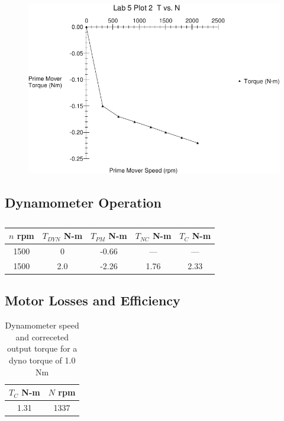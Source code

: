 \documentclass{article}
\begin{document}
\begin{figure}[H]
  \centering
  \includegraphics[width=\textwidth]{img/plot2}
  \caption{}
  \label{fig:plot_02}
\end{figure}

\subsection{Dynamometer Operation}

\begin{table}[H]
  \centering
  \begin{tabular}{*{5}{c}}
    $n$ rpm & $T_{DYN}$ N-m& $T_{PM}$ N-m & $T_{NC}$ N-m & $T_C$ N-m \\
    \hline
    1500 &   0 & -0.66 &  --- &  --- \\
    1500 & 2.0 & -2.26 & 1.76 & 2.33 \\
  \end{tabular}
  \caption{}
  \label{tab:table_03}
\end{table}

\subsection{Motor Losses and Efficiency}
\begin{table}[H]
  \centering
  \begin{tabular}{*{2}{c}}
    $T_{C}$ N-m& $N$ rpm \\
    \hline
    1.31 & 1337  \\
  \end{tabular}
  \caption{Dynamometer speed and correceted output torque for a dyno torque of 1.0 Nm}
  \label{tab:table_04}
\end{table}
\end{document}
